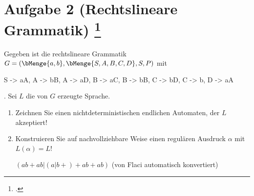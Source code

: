 \documentclass{bschlangaul-aufgabe}
\begin{document}
\let\m=\bMenge

\section{Aufgabe 2 (Rechtslineare Grammatik)
\footcite{examen:46115:2019:09}}

Gegeben ist die rechtslineare Grammatik
$G = (\m{a, b}, \m{S, A, B, C, D}, S, P)$ mit
\begin{bProduktionsRegeln}
S -> aA,
A -> bB,
A -> aD,
B -> aC,
B -> bB,
C -> bD,
C -> b,
D -> aA
\end{bProduktionsRegeln}. Sei $L$ die von $G$ erzeugte Sprache.

\begin{enumerate}


\item Zeichnen Sie einen nichtdeterministischen endlichen Automaten, der
$L$ akzeptiert!

\begin{bAntwort}
\begin{center}
\end{center}
\end{bAntwort}


\item Konstruieren Sie auf nachvollziehbare Weise einen regulären
Ausdruck $\alpha$ mit $L(\alpha)=L$!

\begin{bAntwort}
$(ab+ab|(a|b+)+ab+ab)$
(von Flaci automatisch konvertiert)
\end{bAntwort}

\end{enumerate}
\end{document}
